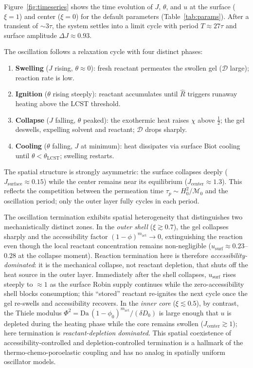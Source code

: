 \documentclass[aps,pre,reprint,superscriptaddress,longbibliography,floatfix]{revtex4-2}
\newcommand{\Ms}{\mathcal{M}}
\newcommand{\Ds}{\mathcal{D}}
\newcommand{\Da}{\mathrm{Da}}
\newcommand{\Rhat}{\widehat{R}}
\begin{document}
Figure~\ref{fig:timeseries} shows the time evolution of $J$, $\theta$, and
$u$ at the surface ($\xi=1$) and center ($\xi=0$) for the default parameters
(Table~\ref{tab:params}). After a transient of $\sim\!3\tau$, the system
settles into a limit cycle with period $T\approx 27\tau$ and surface
amplitude $\Delta J\approx 0.93$.

The oscillation follows a relaxation cycle with four distinct phases:
\begin{enumerate}
  \item \textbf{Swelling} ($J$ rising, $\theta\approx 0$): fresh reactant
    permeates the swollen gel ($\Ds$ large); reaction rate is low.
  \item \textbf{Ignition} ($\theta$ rising steeply): reactant accumulates
    until $\Rhat$ triggers runaway heating above the LCST threshold.
  \item \textbf{Collapse} ($J$ falling, $\theta$ peaked): the exothermic heat
    raises $\chi$ above $\tfrac{1}{2}$; the gel deswells, expelling solvent
    and reactant; $\Ds$ drops sharply.
  \item \textbf{Cooling} ($\theta$ falling, $J$ at minimum): heat dissipates
    via surface Biot cooling until $\theta<\theta_\mathrm{LCST}$; swelling
    restarts.
\end{enumerate}

The spatial structure is strongly asymmetric: the surface collapses deeply
($J_\mathrm{surface}\approx 0.15$) while the center remains near its
equilibrium ($J_\mathrm{center}\approx 1.3$). This reflects the
competition between the permeation time $\tau_p\sim H_0^2/\Ms_0$ and the
oscillation period; only the outer layer fully cycles in each period.

The oscillation termination exhibits spatial heterogeneity that distinguishes
two mechanistically distinct zones. In the \emph{outer shell}
($\xi\gtrsim 0.7$), the gel collapses sharply and the accessibility factor
$(1-\phi)^{m_\mathrm{act}}\to 0$, extinguishing the reaction even though
the local reactant concentration remains non-negligible
($u_\mathrm{surf}\approx 0.23$--$0.28$ at the collapse moment). Reaction
termination here is therefore \emph{accessibility-dominated}: it is the
mechanical collapse, not reactant depletion, that shuts off the heat source
in the outer layer. Immediately after the shell collapses, $u_\mathrm{surf}$
rises steeply to $\approx 1$ as the surface Robin supply continues while the
zero-accessibility shell blocks consumption; this ``stored'' reactant
re-ignites the next cycle once the gel re-swells and accessibility recovers.
In the \emph{inner core} ($\xi\lesssim 0.5$), by contrast, the Thiele
modulus $\Phi^2 = \Da\,(1-\phi_0)^{m_\mathrm{act}}/(\delta D_0)$ is large
enough that $u$ is depleted during the heating phase while the core remains
swollen ($J_\mathrm{center}\gtrsim 1$); here termination is
\emph{reactant-depletion dominated}. This spatial coexistence of
accessibility-controlled and depletion-controlled termination is a hallmark
of the thermo-chemo-poroelastic coupling and has no analog in
spatially uniform oscillator models.
\end{document}
